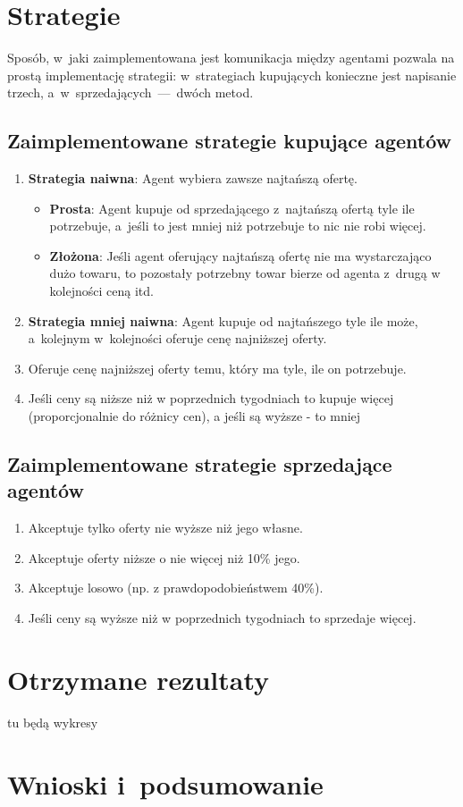 \documentclass[12pt]{article}
\begin{document}
\section{Strategie}
Sposób, w~jaki zaimplementowana jest komunikacja między agentami pozwala na prostą implementację strategii: w~strategiach kupujących konieczne jest napisanie
trzech, a~w~sprzedających~---~dwóch metod.
\subsection{Zaimplementowane strategie kupujące agentów}
\begin{enumerate}
 \item \textbf{Strategia naiwna}: Agent wybiera zawsze najtańszą ofertę.
  \begin{itemize}
  \item \textbf{Prosta}: Agent kupuje od sprzedającego z~najtańszą ofertą tyle ile potrzebuje, a~jeśli to jest mniej niż potrzebuje to nic nie robi więcej.
  \item \textbf{Złożona}: Jeśli agent oferujący najtańszą ofertę nie ma wystarczająco dużo towaru, to pozostały potrzebny towar bierze od agenta z~drugą w kolejności ceną itd.
  \end{itemize}
 \item \textbf{Strategia mniej naiwna}: Agent kupuje od najtańszego tyle ile może, a~kolejnym w~kolejności oferuje cenę najniższej oferty.
 \item Oferuje cenę najniższej oferty temu, który ma tyle, ile on potrzebuje.
 \item Jeśli ceny są niższe niż w poprzednich tygodniach to kupuje więcej (proporcjonalnie do różnicy cen), a jeśli są wyższe - to mniej
\end{enumerate}

\subsection{Zaimplementowane strategie sprzedające agentów}
\begin{enumerate}
 \item Akceptuje tylko oferty nie wyższe niż jego własne.
 \item Akceptuje oferty niższe o nie więcej niż 10\% jego.
 \item Akceptuje losowo (np. z prawdopodobieństwem 40\%).
 \item Jeśli ceny są wyższe niż w poprzednich tygodniach to sprzedaje więcej.
\end{enumerate}


\section{Otrzymane rezultaty}\label{chapter: rezultaty}
tu będą wykresy
\section{Wnioski i~podsumowanie}
\end{document}
